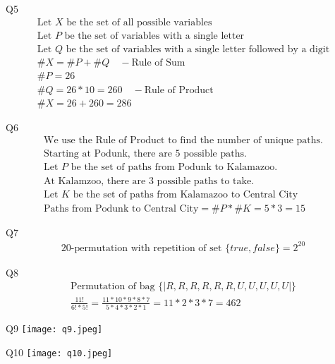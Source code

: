 \documentclass{article}
\begin{document}
    \vspace{10mm}
    Q5
    \begin{gather*}
        \text{Let $X$ be the set of all possible variables} \\
        \text{Let $P$ be the set of variables with a single letter} \\
        \text{Let $Q$ be the set of variables with a single letter followed by a digit} \\
        \#X = \#P + \#Q \quad -\text{Rule of Sum} \\
        \#P = 26 \\
        \#Q = 26 * 10 = 260 \quad -\text{Rule of Product} \\
        \#X = 26 + 260 = 286
    \end{gather*}

    \vspace{10mm}
    Q6
    \begin{gather*}
        \text{We use the Rule of Product to find the number of unique paths.} \\
        \text{Starting at Podunk, there are 5 possible paths.} \\   
        \text{Let $P$ be the set of paths from Podunk to Kalamazoo.} \\
        \text{At Kalamzoo, there are 3 possible paths to take.} \\
        \text{Let $K$ be the set of paths from Kalamazoo to Central City} \\
        \text{Paths from Podunk to Central City} = \#P * \#K = 5*3 = 15
    \end{gather*}

\vspace{10mm}
    Q7
    \begin{gather*}
        \text{20-permutation with repetition of set $\{true,false\}$} = 2^{20}
    \end{gather*}

    \vspace{10mm}
    Q8
    \begin{gather*}
        \text{Permutation of bag } \{\!| R,R,R,R,R,R,U,U,U,U,U |\!\} \\
        \frac{11!}{6!*5!} = \frac{11*10*9*8*7}{5*4*3*2*1} = 11*2*3*7 = 462
    \end{gather*}

    \newpage
    Q9
    \texttt{[image: q9.jpeg]}

    \vspace{10mm}
    Q10
    \texttt{[image: q10.jpeg]}
\end{document}
